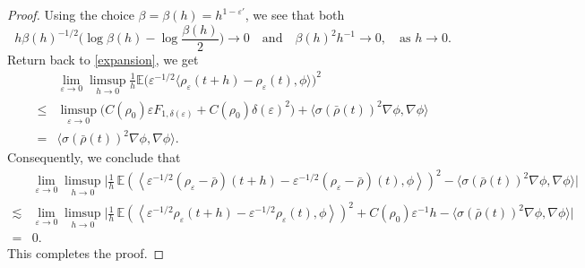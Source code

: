 \documentclass[UTF-8,reqno]{amsart}
\numberwithin{equation}{section}
\def\leq{\leqslant}
\def\leq{\leqslant}
\begin{document}
\begin{proof}
Using the choice $\beta = \beta(h) = h^{1 - \varepsilon'}$, we see that both
$$
h\beta(h)^{-1/2}\Big(\log\beta(h) - \log\frac{\beta(h)}{2}\Big) \to 0 \quad \text{and} \quad \beta(h)^2 h^{-1} \to 0, \quad \text{as } h \to 0.
$$
Return back to \eqref{expansion}, we get
\begin{align*}
&\lim_{\varepsilon\rightarrow0}\limsup_{h\rightarrow0}\frac{1}{h}\mathbb{E}\Big(\varepsilon^{-1/2}\langle\rho_{\varepsilon}(t+h)-\rho_{\varepsilon}(t),\phi\rangle\Big)^2\\
\leq&\limsup_{\varepsilon\rightarrow0}	\Big(C(\rho_0)\varepsilon F_{1,\delta(\varepsilon)}+C(\rho_0)\delta(\varepsilon)^2\Big)+\langle \sigma(\bar{\rho}(t))^2 \nabla \phi, \nabla \phi \rangle\\
=&\langle \sigma(\bar{\rho}(t))^2 \nabla \phi, \nabla \phi \rangle.
\end{align*}
Consequently, we conclude that 
\begin{align*}
&\lim_{\varepsilon\rightarrow0}\limsup_{h\rightarrow0}\Big|\frac{1}{h} \, \mathbb{E} \left( \left\langle \varepsilon^{-1/2}(\rho_{\varepsilon} - \bar{\rho})(t + h) - \varepsilon^{-1/2}(\rho_{\varepsilon} - \bar{\rho})(t), \phi \right\rangle \right)^2-\langle \sigma(\bar{\rho}(t))^2 \nabla \phi, \nabla \phi \rangle\Big|\\ 
\lesssim& \lim_{\varepsilon\rightarrow0}\limsup_{h\rightarrow0}\Big|\frac{1}{h} \, \mathbb{E} \left( \left\langle \varepsilon^{-1/2} \rho_{\varepsilon}(t + h) - \varepsilon^{-1/2} \rho_{\varepsilon}(t), \phi \right\rangle \right)^2 
+ C(\rho_0) \varepsilon^{-1} h-\langle \sigma(\bar{\rho}(t))^2 \nabla \phi, \nabla \phi \rangle\Big|\\
=&0.
\end{align*}
This completes the proof. 
\end{proof}
\end{document}
